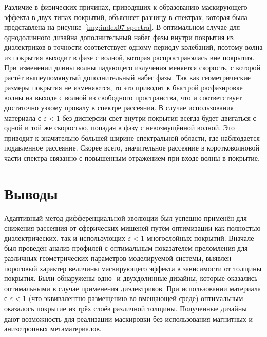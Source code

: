 Различие в физических причинах, приводящих к образованию маскирующего
эффекта в двух типах покрытий, объясняет разницу в спектрах, которая
была представлена на рисунке~\ref{img:index07-spectra}. В оптимальном
случае для однодолинного дизайна дополнительный набег фазы внутри
покрытия из диэлектриков в точности соответствует одному периоду
колебаний, поэтому волна из покрытия выходит в фазе с волной, которая
распространялась вне покрытия. При изменении длины волны падающего
излучения меняется скорость, с которой растёт вышеупомянутый
дополнительный набег фазы. Так как геометрические размеры покрытия не
изменяются, то это приводит к быстрой расфазировке волны на выходе с
волной из свободного пространства, что и соответствует достаточно
узкому провалу в спектре рассеяния. В случае использования материала с
${\varepsilon<1}$ без дисперсии свет внутри покрытия всегда будет
двигаться с одной и той же скоростью, попадая в фазу с невозмущённой
волной. Это приводит к значительно большей ширине спектральной
области, где наблюдается подавленное рассеяние. Скорее всего,
значительное рассеяние в коротковолновой части спектра связанно с
повышенным отражением при входе волны в покрытие.

\section{Выводы}


Адаптивный метод дифференциальной эволюции  был успешно
применён для снижения рассеяния от сферических мишеней путём
оптимизации как полностью диэлектрических, так и использующих 
$\varepsilon < 1$ многослойных покрытий.  Вначале был проведён анализ
профилей с оптимальным показателем преломления для различных
геометрических параметров моделируемой системы, выявлен пороговый
характер величины маскирующего эффекта в зависимости от толщины
покрытия.  Были обнаружены одно- и двухдолинные дизайны, которые
оказались оптимальными в случае применения диэлектриков. При
использовании материала с $\varepsilon < 1$ (что эквивалентно
размещению во вмещающей среде) оптимальным оказалось покрытие из трёх
слоёв различной толщины. Полученные дизайны дают возможность для
реализации маскировки без использования магнитных и анизотропных
метаматериалов.



\clearpage